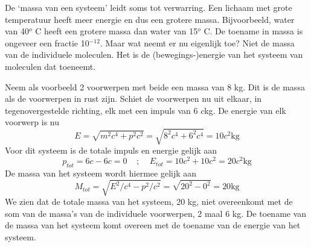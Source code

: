 De `massa van een systeem' leidt soms tot verwarring. Een lichaam met grote temperatuur heeft meer energie en 
dus een grotere massa. Bijvoorbeeld, water van 40$^o$ C heeft een grotere massa dan water van 15$^o$ C. De toename in massa is ongeveer een fractie 10$^{-12}$. Maar wat neemt er nu eigenlijk toe? Niet de massa van de individuele
moleculen. Het is de (bewegings-)energie van het systeem van moleculen dat toeneemt.

Neem als voorbeeld 2 voorwerpen met beide een massa van 8 kg. Dit is de massa als de voorwerpen in rust zijn.
Schiet de voorwerpen nu uit elkaar, in tegenovergestelde richting, elk met een impuls van 6 $c$kg.
De energie van elk voorwerp is nu
\[
E=\sqrt{m^2c^4+p^2c^2} = \sqrt{8^2 c^4 + 6^2 c^4} = 10 c^2 \mbox{kg}
\]
Voor dit systeem is de totale impuls en energie gelijk aan
\[
p_{tot} = 6c-6c = 0 \;\;\;\; ; \;\;\;\; E_{tot} = 10 c^2 + 10 c^2 = 20c^2 \mbox{kg}
\]
De massa van het systeem wordt hiermee gelijk aan
\[
M_{tot} = \sqrt{E^2/c^4 - p^2/c^2} = \sqrt{ 20^2 - 0^2 } = 20  \mbox{kg}
\]
We zien dat de totale massa van het systeem, 20 kg, niet overeenkomt met de som van de massa's van de individuele
voorwerpen, 2 maal 6 kg. De toename van de massa van het systeem komt overeen met de toename van de energie van het systeem.


 
